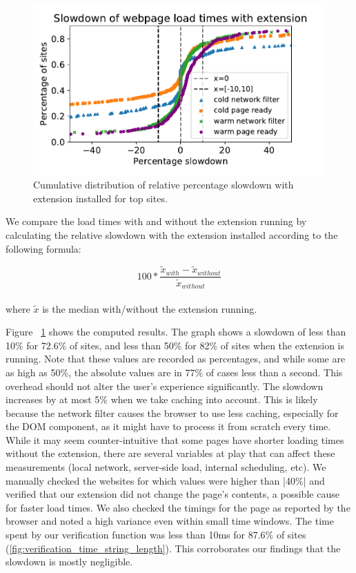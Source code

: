 \begin{figure}[h]
	\includegraphics[scale=0.5]{results/extension_slowdown_overall_small.pdf}
	\caption{Cumulative distribution of relative percentage slowdown with extension installed for top sites.}
	\label{fig:overall_slowdown}
\end{figure}

We compare the load times with and without the extension running by calculating the relative slowdown with the extension installed according to the following formula: 

\begin{equation*}
100*\frac{\tilde{x}_{with}-\tilde{x}_{without}}{\tilde{x}_{without}}
\end{equation*}
\\
where $\tilde{x}$ is the median with/without the extension running.

Figure ~\ref{fig:overall_slowdown} shows the computed results. The graph shows a slowdown of less than 10\% for 72.6\% of sites, and less than 50\% for 82\% of sites when the extension is running. Note that these values are recorded as percentages, and while some are as high as 50\%, the absolute values are in 77\% of cases less than a second. This overhead should not alter the user's experience significantly. The slowdown increases by at most 5\% when we take caching into account. This is likely because the network filter causes the browser to use less caching, especially for the DOM component, as it might have to process it from scratch every time. While it may seem counter-intuitive that some pages have shorter loading times without the extension, there are several variables at play that can affect these measurements (local network, server-side load, internal scheduling, etc). We manually checked the websites for which values were higher than |40\%| and verified that our extension did not change the page's contents, a possible cause for faster load times. We also checked the timings for the page as reported by the browser and noted a high variance even within small time windows. The time spent by our verification function was less than 10ms for 87.6\% of sites (\autoref{fig:verification_time_string_length}). This corroborates our findings that the slowdown is mostly negligible.

